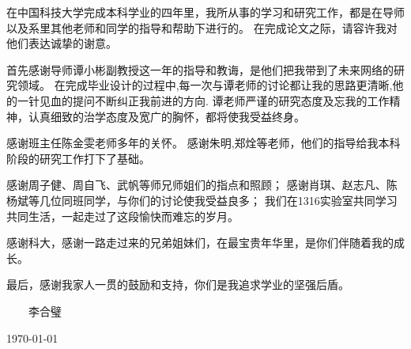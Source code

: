 ﻿
\begin{thanks}


在中国科技大学完成本科学业的四年里，我所从事的学习和研究工作，都是在导师以及系里其他老师和同学的指导和帮助下进行的。
在完成论文之际，请容许我对他们表达诚挚的谢意。

首先感谢导师谭小彬副教授这一年的指导和教诲，是他们把我带到了未来网络的研究领域。
在完成毕业设计的过程中,每一次与谭老师的讨论都让我的思路更清晰,他的一针见血的提问不断纠正我前进的方向.
谭老师严谨的研究态度及忘我的工作精神，认真细致的治学态度及宽广的胸怀，都将使我受益终身。

感谢班主任陈金雯老师多年的关怀。
感谢朱明,郑烇等老师，他们的指导给我本科阶段的研究工作打下了基础。

感谢周子健、周自飞、武帆等师兄师姐们的指点和照顾；
感谢肖琪、赵志凡、陈杨斌等几位同班同学，与你们的讨论使我受益良多；
我们在1316实验室共同学习共同生活，一起走过了这段愉快而难忘的岁月。

感谢科大，感谢一路走过来的兄弟姐妹们，在最宝贵年华里，是你们伴随着我的成长。

最后，感谢我家人一贯的鼓励和支持，你们是我追求学业的坚强后盾。

\vskip 18pt

\begin{flushright}

~~~~李合璧~~~~

\today

\end{flushright}

\end{thanks}
